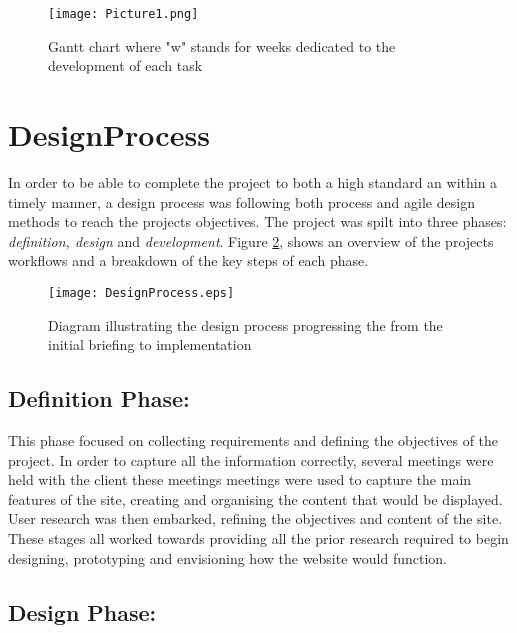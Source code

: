 \begin{landscape}
\begin{figure}[H]
      \centering
      \texttt{[image: Picture1.png]}
      \caption{Gantt chart where "w" stands for weeks dedicated to the development of each task}
\label{gantt}
 \end{figure}
 \end{landscape}

\newpage

\hypertarget{designprocess}{%
\section{DesignProcess}\label{designprocess}}

In order to be able to complete the project to both a high standard an
within a timely manner, a design process was following both process and
agile design methods to reach the projects objectives. The project was
spilt into three phases: \emph{definition, design} and
\emph{development}. Figure \ref{designprocess}, shows an overview of the
projects workflows and a breakdown of the key steps of each phase.

\begin{figure}[H]
\centering
\texttt{[image: DesignProcess.eps]}
\caption{Diagram illustrating the design process progressing the from the initial briefing to implementation}
\label{designprocess}
\end{figure}

\hypertarget{definition-phase}{%
\subsection{Definition Phase:}\label{definition-phase}}

This phase focused on collecting requirements and defining the
objectives of the project. In order to capture all the information
correctly, several meetings were held with the client these meetings
meetings were used to capture the main features of the site, creating
and organising the content that would be displayed. User research was
then embarked, refining the objectives and content of the site. These
stages all worked towards providing all the prior research required to
begin designing, prototyping and envisioning how the website would
function.

\hypertarget{design-phase}{%
\subsection{Design Phase:}\label{design-phase}}

